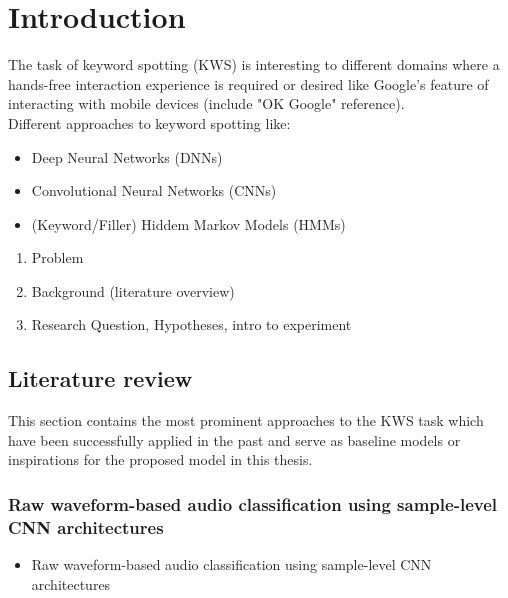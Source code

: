 \documentclass{article}
\theoremstyle{definition}
\theoremstyle{remark}
\begin{document}
\tableofcontents

\newpage

\section{Introduction}

The task of keyword spotting (KWS) is interesting to different domains where a hands-free interaction experience is required or desired like Google's feature of interacting with mobile devices (include "OK Google" reference). \\

Different approaches to keyword spotting like:

\begin{itemize}
	\item Deep Neural Networks (DNNs)
	\item Convolutional Neural Networks (CNNs)
	\item (Keyword/Filler) Hiddem Markov Models (HMMs)
\end{itemize}



\begin{enumerate}
	\item Problem
	\item Background (literature overview)
	\item Research Question, Hypotheses, intro to experiment
\end{enumerate}

\subsection{Literature review}

This section contains the most prominent approaches to the KWS task which have been successfully applied in the past and serve as baseline models or inspirations for the proposed model in this thesis. 

\subsubsection{Raw waveform-based audio classification using sample-level CNN architectures}

\begin{itemize}
	\item Raw waveform-based audio classification using sample-level CNN architectures \cite{lee2017raw}
\end{itemize}
\end{document}
